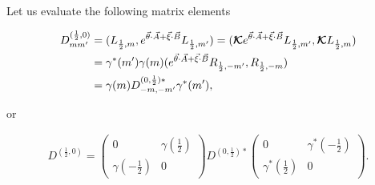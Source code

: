 \documentclass[12pt]{beamer}
\newcommand{\Kappa}[0]{\bm{\mathcal{K}}}
\begin{document}
\begin{frame}
Let us evaluate the following matrix elements

\begin{align}
\notag D^{(\frac{1}{2},0)}_{mm'}&=(L_{\frac{1}{2},m},e^{\vec{\theta}\cdot\vec{A}+\vec{\xi}\cdot\vec{B}}L_{\frac{1}{2},m'})
=(\Kappa e^{\vec{\theta}\cdot\vec{A}+\vec{\xi}\cdot\vec{B}}L_{\frac{1}{2},m'},\Kappa L_{\frac{1}{2},m})\\
\notag &=\gamma^*(m')\gamma(m)(e^{\vec{\theta}\cdot\vec{A}+\vec{\xi}\cdot\vec{B}}R_{\frac{1}{2},-m'},R_{\frac{1}{2},-m})\\&=\gamma(m)D^{(0,\frac{1}{2})*}_{-m,-m'}\gamma^*(m'),
\end{align}

\noindent or

\begin{align}
D^{(\frac{1}{2},0)}=\begin{pmatrix}0&\gamma(\frac{1}{2})\\\gamma(-\frac{1}{2})&0\end{pmatrix}D^{(0,\frac{1}{2})*}\begin{pmatrix}0&\gamma^*(-\frac{1}{2})\\\gamma^*(\frac{1}{2})&0\end{pmatrix}.
\end{align}
\end{frame}
\end{document}
